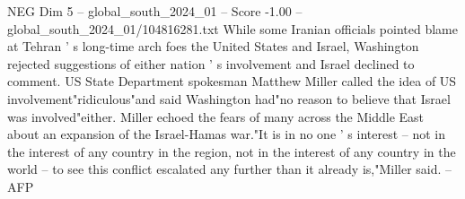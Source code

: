 \begin{textsample}{NEG Dim 5 – global\_south\_2024\_01 – Score -1.00 – global\_south\_2024\_01/104816281.txt}
While some Iranian officials pointed blame at Tehran ' s long-time arch foes the United States and Israel, Washington rejected suggestions of either nation ' s involvement and Israel declined to comment.
US State Department spokesman Matthew Miller called the idea of US involvement"ridiculous"and said Washington had"no reason to believe that Israel was involved"either.
Miller echoed the fears of many across the Middle East about an expansion of the Israel-Hamas war."It is in no one ' s interest -- not in the interest of any country in the region, not in the interest of any country in the world -- to see this conflict escalated any further than it already is,"Miller said. -- AFP

\end{textsample}
